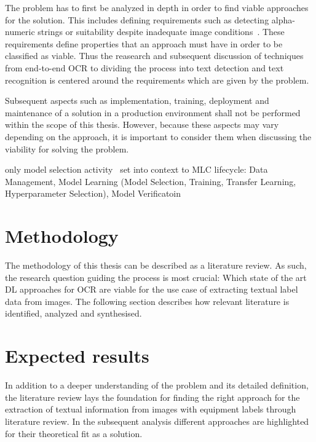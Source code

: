 The problem has to first be analyzed in depth in order to find viable approaches for the solution.
This includes defining requirements such as detecting alpha-numeric strings or suitability despite
inadequate image conditions~\citep{ghosh_visual_2017, hu_gtc_2020}.
These requirements define properties that an approach must have in order to be classified as viable.
Thus the reasearch and subsequent discussion of techniques from end-to-end \ac{OCR} to dividing the
process into text detection and text recognition is centered around the requirements which are
given by the problem.

Subsequent aspects such as implementation, training, deployment and maintenance of a solution in a
production environment shall not be performed within the scope of this thesis.
However, because these aspects may vary depending on the approach, it is important to consider them when
discussing the viability for solving the problem.

only model selection activity~\citep{ashmore_assuring_2021}
set into context to MLC lifecycle: Data Management, Model Learning (Model Selection, Training,
Transfer Learning, Hyperparameter Selection), Model Verificatoin

\section{Methodology}\label{se:methodology}
The methodology of this thesis can be described as a literature review.
As such, the research question guiding the process is most crucial: Which state of the art \ac{DL}
approaches for \ac{OCR} are viable for the use case of extracting textual label data from
images.
The following section describes how relevant literature is identified, analyzed and synthesised.

\section{Expected results}
In addition to a deeper understanding of the problem and its detailed definition, the literature
review lays the foundation for finding the right approach for the extraction of textual
information from images with equipment labels through literature review.
In the subsequent analysis different approaches are highlighted for their theoretical fit as a solution.

